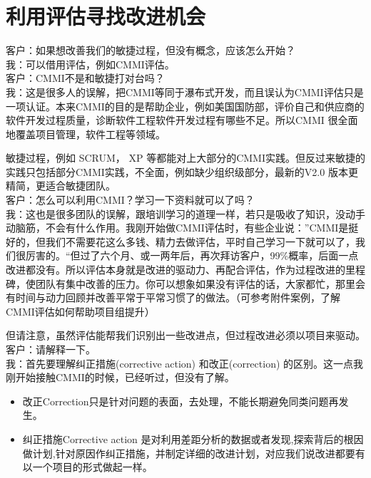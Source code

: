 \chapter{利用评估寻找改进机会} %

客户：如果想改善我们的敏捷过程，但没有概念，应该怎么开始？\\
我：可以借用评估，例如CMMI评估。\\
客户：CMMI不是和敏捷打对台吗？\\
我：这是很多人的误解，把CMMI等同于瀑布式开发，而且误认为CMMI评估只是一项认证。本来CMMI的目的是帮助企业，例如美国国防部，评价自己和供应商的软件开发过程质量，诊断软件工程软件开发过程有哪些不足。所以CMMI
很全面地覆盖项目管理，软件工程等领域。

敏捷过程，例如 SCRUM， XP
等都能对上大部分的CMMI实践。但反过来敏捷的实践只包括部分CMMI实践，不全面，例如缺少组织级部分，最新的V2.0
版本更精简，更适合敏捷团队。\\
客户：怎么可以利用CMMI？学习一下资料就可以了吗？\\
我：这也是很多团队的误解，跟培训学习的道理一样，若只是吸收了知识，没动手动脑筋，不会有什么作用。我刚开始做CMMI评估时，有些企业说：''CMMI是挺好的，但我们不需要花这么多钱、精力去做评估，平时自己学习一下就可以了，我们很厉害的。``但过了六个月、或一两年后，再次拜访客户，99\%概率，后面一点改进都没有。所以评估本身就是改进的驱动力、再配合评估，作为过程改进的里程碑，使团队有集中改善的压力。你可以想象如果没有评估的话，大家都忙，那里会有时间与动力回顾并改善平常于平常习惯了的做法。（可参考附件案例，了解CMMI评估如何帮助项目组提升）

但请注意，虽然评估能帮我们识别出一些改进点，但过程改进必须以项目来驱动。\\
客户：请解释一下。\\
我：首先要理解纠正措施(corrective action) 和改正(correction)
的区别。这一点我刚开始接触CMMI的时候，已经听过，但没有了解。

\begin{itemize}
\tightlist
\item
  改正Correction只是针对问题的表面，去处理，不能长期避免同类问题再发生。
\item
  纠正措施Corrective action
  是对利用差距分析的数据或者发现,探索背后的根因做计划,针对原因作纠正措施，并制定详细的改进计划，对应我们说改进都要有以一个项目的形式做起一样。
\end{itemize}

